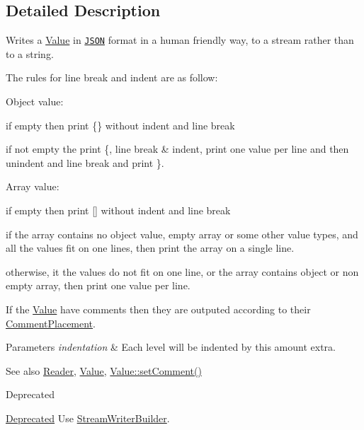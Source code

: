 \subsection{Detailed Description}
Writes a \hyperlink{classJson_1_1Value}{Value} in \href{http://www.json.org}{\tt J\+S\+ON} format in a human friendly way, to a stream rather than to a string. 

The rules for line break and indent are as follow\+:
\begin{DoxyItemize}
\item Object value\+:
\begin{DoxyItemize}
\item if empty then print \{\} without indent and line break
\item if not empty the print \textquotesingle{}\{\textquotesingle{}, line break \& indent, print one value per line and then unindent and line break and print \textquotesingle{}\}\textquotesingle{}.
\end{DoxyItemize}
\item Array value\+:
\begin{DoxyItemize}
\item if empty then print \mbox{[}\mbox{]} without indent and line break
\item if the array contains no object value, empty array or some other value types, and all the values fit on one lines, then print the array on a single line.
\item otherwise, it the values do not fit on one line, or the array contains object or non empty array, then print one value per line.
\end{DoxyItemize}
\end{DoxyItemize}

If the \hyperlink{classJson_1_1Value}{Value} have comments then they are outputed according to their \hyperlink{namespaceJson_a4fc417c23905b2ae9e2c47d197a45351}{Comment\+Placement}.


\begin{DoxyParams}{Parameters}
{\em indentation} & Each level will be indented by this amount extra. \\
\hline
\end{DoxyParams}
\begin{DoxySeeAlso}{See also}
\hyperlink{classJson_1_1Reader}{Reader}, \hyperlink{classJson_1_1Value}{Value}, \hyperlink{classJson_1_1Value_a29f3a30f7e5d3af6f38d57999bf5b480}{Value\+::set\+Comment()} 
\end{DoxySeeAlso}
\begin{DoxyRefDesc}{Deprecated}
\item[\hyperlink{deprecated__deprecated000010}{Deprecated}]Use \hyperlink{classJson_1_1StreamWriterBuilder}{Stream\+Writer\+Builder}. \end{DoxyRefDesc}


